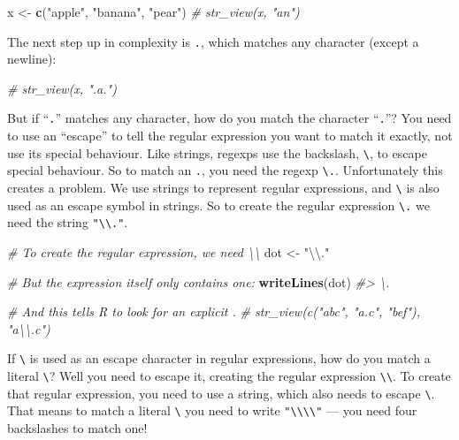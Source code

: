 \documentclass[]{book}
\newenvironment{Shaded}{\begin{snugshade}}{\end{snugshade}}
\newcommand{\KeywordTok}[1]{\textcolor[rgb]{0.13,0.29,0.53}{\textbf{{#1}}}}
\newcommand{\CharTok}[1]{\textcolor[rgb]{0.31,0.60,0.02}{{#1}}}
\newcommand{\StringTok}[1]{\textcolor[rgb]{0.31,0.60,0.02}{{#1}}}
\newcommand{\CommentTok}[1]{\textcolor[rgb]{0.56,0.35,0.01}{\textit{{#1}}}}
\newcommand{\NormalTok}[1]{{#1}}
\begin{document}
\begin{Shaded}
\begin{Highlighting}[]
\NormalTok{x <-}\StringTok{ }\KeywordTok{c}\NormalTok{(}\StringTok{"apple"}\NormalTok{, }\StringTok{"banana"}\NormalTok{, }\StringTok{"pear"}\NormalTok{)}
\CommentTok{# str_view(x, "an")}
\end{Highlighting}
\end{Shaded}

The next step up in complexity is \texttt{.}, which matches any
character (except a newline):

\begin{Shaded}
\begin{Highlighting}[]
\CommentTok{# str_view(x, ".a.")}
\end{Highlighting}
\end{Shaded}

But if ``\texttt{.}'' matches any character, how do you match the
character ``\texttt{.}''? You need to use an ``escape'' to tell the
regular expression you want to match it exactly, not use its special
behaviour. Like strings, regexps use the backslash,
\texttt{\textbackslash{}}, to escape special behaviour. So to match an
\texttt{.}, you need the regexp \texttt{\textbackslash{}.}.
Unfortunately this creates a problem. We use strings to represent
regular expressions, and \texttt{\textbackslash{}} is also used as an
escape symbol in strings. So to create the regular expression
\texttt{\textbackslash{}.} we need the string
\texttt{"\textbackslash{}\textbackslash{}."}.

\begin{Shaded}
\begin{Highlighting}[]
\CommentTok{# To create the regular expression, we need \textbackslash{}\textbackslash{}}
\NormalTok{dot <-}\StringTok{ "}\CharTok{\textbackslash{}\textbackslash{}}\StringTok{."}

\CommentTok{# But the expression itself only contains one:}
\KeywordTok{writeLines}\NormalTok{(dot)}
\CommentTok{#> \textbackslash{}.}

\CommentTok{# And this tells R to look for an explicit .}
\CommentTok{# str_view(c("abc", "a.c", "bef"), "a\textbackslash{}\textbackslash{}.c")}
\end{Highlighting}
\end{Shaded}

If \texttt{\textbackslash{}} is used as an escape character in regular
expressions, how do you match a literal \texttt{\textbackslash{}}? Well
you need to escape it, creating the regular expression
\texttt{\textbackslash{}\textbackslash{}}. To create that regular
expression, you need to use a string, which also needs to escape
\texttt{\textbackslash{}}. That means to match a literal
\texttt{\textbackslash{}} you need to write
\texttt{"\textbackslash{}\textbackslash{}\textbackslash{}\textbackslash{}"}
--- you need four backslashes to match one!
\end{document}
